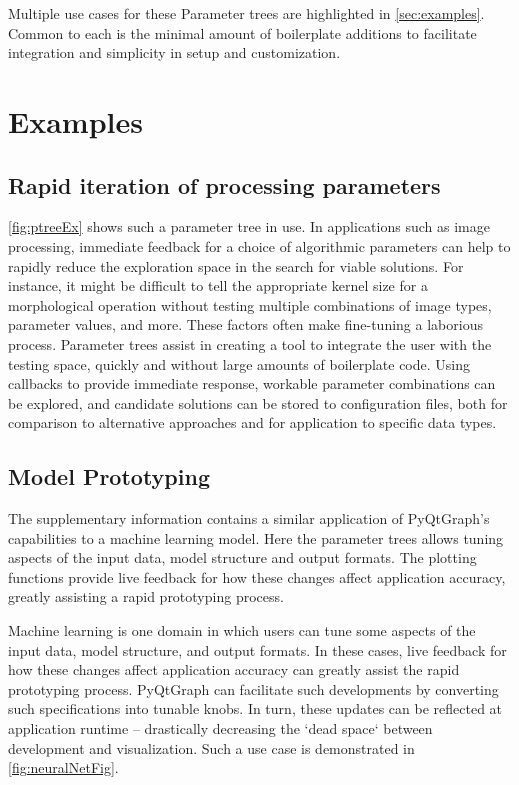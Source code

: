 \documentclass[journal]{vgtc}                %
\begin{document}
Multiple use cases for these Parameter trees are highlighted in \autoref{sec:examples}. Common to each is the minimal amount of boilerplate additions to facilitate integration and simplicity in setup and customization.

\color{black}

\section{Examples}\label{sec:examples}

\subsection{Rapid iteration of processing parameters}

\color{DarkOrchid}
\autoref{fig:ptreeEx} shows such a parameter tree in use. 
In applications such as image processing, immediate feedback for a choice of algorithmic parameters can help to rapidly reduce the exploration space in the search for viable solutions. For instance, it might be difficult to tell the appropriate kernel size for a morphological operation without testing multiple combinations of image types, parameter values, and more. These factors often make fine-tuning a laborious process. Parameter trees assist in creating a tool to integrate the user with the testing space, quickly and without large amounts of boilerplate code. Using callbacks to provide immediate response, workable parameter combinations can be explored, and candidate solutions can be stored to configuration files, both for comparison to alternative approaches and for application to specific data types.
\makePtreeExFig

\subsection{Model Prototyping}
\color{DarkOrchid}
The supplementary information contains a similar application of PyQtGraph's capabilities to a machine learning model. Here the parameter trees allows tuning aspects of the input data, model structure and output formats. The plotting functions provide live feedback for how these changes affect application accuracy, greatly assisting a rapid prototyping process.

\color{brown}
Machine learning is one domain in which users can tune some aspects of the input data, model structure, and output formats. In these cases, live feedback for how these changes affect application accuracy can greatly assist the rapid prototyping process. PyQtGraph can facilitate such developments by converting such specifications into tunable knobs. In turn, these updates can be reflected at application runtime -- drastically decreasing the `dead space` between development and visualization. Such a use case is demonstrated in \autoref{fig:neuralNetFig}.
\end{document}
